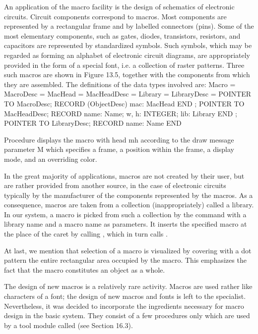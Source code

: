 An application of the macro facility is the design of schematics of electronic circuits. Circuit components correspond to macros. Most components are represented by a rectangular frame and by labelled connectors (pins). Some of the most elementary components, such as gates, diodes, transistors, resistors, and capacitors are represented by standardized symbols. Such symbols, which may be regarded as forming an alphabet of electronic circuit diagrams, are appropriately provided in the form of a special font, i.e. a collection of raster patterns. Three such macros are shown in Figure 13.5, together with the components from which they are assembled. The definitions of the data types involved are:
\begintt
Macro = MacroDesc =
MacHead = MacHeadDesc =
Library = LibraryDesc =
POINTER TO MacroDesc;
RECORD (ObjectDesc) mac: MacHead END ;
POINTER TO MacHeadDesc; RECORD name: Name;
w, h: INTEGER; lib: Library END ;
POINTER TO LibraryDesc; RECORD name: Name END
\endtt

Procedure  displays the macro with head mh according to the draw message parameter M which specifies a frame, a position within the frame, a display mode, and an overriding color.

In the great majority of applications, macros are not created by their user, but are rather provided from another source, in the case of electronic circuits typically by the manufacturer of the components represented by the macros. As a consequence, macros are taken from a collection (inappropriately) called a library. In our system, a macro is picked from such a collection by the command  with a library name and a macro name as parameters. It inserts the specified macro at the place of the caret by calling , which in turn calls .

At last, we mention that selection of a macro is visualized by covering with a dot pattern the entire rectangular area occupied by the macro. This emphasizes the fact that the macro constitutes an object as a whole.

The design of new macros is a relatively rare activity. Macros are used rather like characters of a font; the design of new macros and fonts is left to the specialist. Nevertheless, it was decided to incorporate the ingredients necessary for macro design in the basic system. They consist of a few procedures only which are used by a tool module called  (see Section 16.3).

